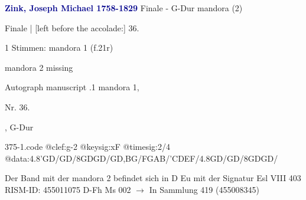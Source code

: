\documentclass[twocolumn]{book}
\begin{document}
\newline \par \vspace{7pt} \textcolor{darkblue}{\textbf{Zink, Joseph Michael  1758-1829}}
\newline Finale - G-Dur
\newline mandora (2)
\newline \begin{itshape}[f.21r, at left:] Finale | [left before the accolade:] 36.\end{itshape} 
\newline \textcolor{darkblue}{}  1 Stimmen: mandora 1  (f.21r)
\newline \begin{small} mandora 2 missing\end{small} 
\newline Autograph manuscript
.1  mandora 1, \begin{itshape}Nr. 36.\end{itshape}, G-Dur  
\begin{filecontents*}{375-1.code}
@clef:g-2
@keysig:xF
@timesig:2/4
@data:4.8'GD/GD/8GDGD/GD,BG/FGAB/'CDEF/4.8GD/GD/8GDGD/
\end{filecontents*}
\newline
%
\newline Der Band mit der mandora 2 befindet sich in D Eu mit der Signatur Esl VIII 403
\newline RISM-ID: 455011075
\newline D-Fh  Ms 002
\newline $\rightarrow$ In Sammlung 419 (455008345)
      
\end{document}
